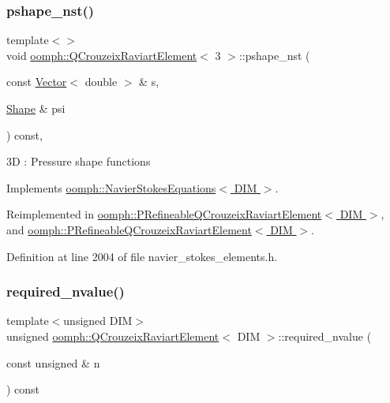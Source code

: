 \subsubsection{\texorpdfstring{pshape\+\_\+nst()}{pshape\_nst()}\hspace{0.1cm}{\footnotesize\ttfamily [4/4]}}
{\footnotesize\ttfamily template$<$$>$ \\
void \hyperlink{classoomph_1_1QCrouzeixRaviartElement}{oomph\+::\+Q\+Crouzeix\+Raviart\+Element}$<$ 3 $>$\+::pshape\+\_\+nst (\begin{DoxyParamCaption}\item[{const \hyperlink{classoomph_1_1Vector}{Vector}$<$ double $>$ \&}]{s,  }\item[{\hyperlink{classoomph_1_1Shape}{Shape} \&}]{psi }\end{DoxyParamCaption}) const\hspace{0.3cm}{\ttfamily [inline]}, {\ttfamily [virtual]}}

3D \+: Pressure shape functions 

Implements \hyperlink{classoomph_1_1NavierStokesEquations_a487030303b71da299aed3d4639a022ab}{oomph\+::\+Navier\+Stokes\+Equations$<$ D\+I\+M $>$}.



Reimplemented in \hyperlink{classoomph_1_1PRefineableQCrouzeixRaviartElement_a556b7533944abd5eedce664d708b4eae}{oomph\+::\+P\+Refineable\+Q\+Crouzeix\+Raviart\+Element$<$ D\+I\+M $>$}, and \hyperlink{classoomph_1_1PRefineableQCrouzeixRaviartElement_a87afeb50892736eace1e3d68d6c53172}{oomph\+::\+P\+Refineable\+Q\+Crouzeix\+Raviart\+Element$<$ D\+I\+M $>$}.



Definition at line 2004 of file navier\+\_\+stokes\+\_\+elements.\+h.

\mbox{\label{classoomph_1_1QCrouzeixRaviartElement_a025946afee7e1ff977fb24569c438fd0}} 
\subsubsection{\texorpdfstring{required\+\_\+nvalue()}{required\_nvalue()}}
{\footnotesize\ttfamily template$<$unsigned D\+IM$>$ \\
unsigned \hyperlink{classoomph_1_1QCrouzeixRaviartElement}{oomph\+::\+Q\+Crouzeix\+Raviart\+Element}$<$ D\+IM $>$\+::required\+\_\+nvalue (\begin{DoxyParamCaption}\item[{const unsigned \&}]{n }\end{DoxyParamCaption}) const\hspace{0.3cm}{\ttfamily [virtual]}}



